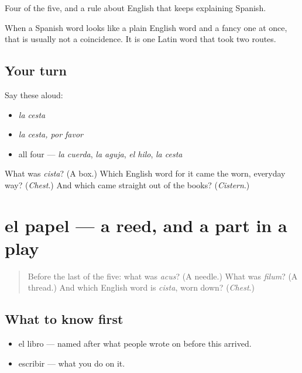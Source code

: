 \begin{grammarlens}[title={What you've built}]
Four of the five, and a rule about English that keeps explaining Spanish.

When a Spanish word looks like a plain English word and a fancy one at once, that is usually not a coincidence. It is one Latin word that took two routes.
\end{grammarlens}

\subsection*{Your turn}
Say these aloud:

\begin{itemize}
\raggedright
  \item \emph{la cesta}
  \item \emph{la cesta, por favor}
  \item all four — \emph{la cuerda}, \emph{la aguja}, \emph{el hilo}, \emph{la cesta}
\end{itemize}

\begin{tcolorbox}[breakable,colback=teal!4,colframe=teal!35!black,title={Before you move on}]
What was \emph{cista}? (A box.) Which English word for it came the worn, everyday way? (\emph{Chest}.) And which came straight out of the books? (\emph{Cistern}.)
\end{tcolorbox}
\section[el papel]{el papel — a reed, and a part in a play}

\label{lesson:ES-C301-papel}



\begin{quote}
Before the last of the five: what was \emph{acus}? (A needle.) What was \emph{filum}? (A thread.) And which English word is \emph{cista}, worn down? (\emph{Chest}.)
\end{quote}

\subsection*{What to know first}
\begin{itemize}
\raggedright
  \item el libro — named after what people wrote on before this arrived.
  \item escribir — what you do on it.
\end{itemize}

